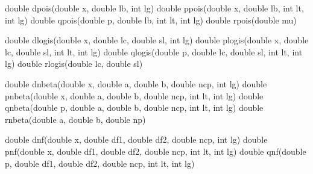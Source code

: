 \documentclass[]{book}
\newenvironment{Shaded}{\begin{snugshade}}{\end{snugshade}}
\newcommand{\DataTypeTok}[1]{\textcolor[rgb]{0.13,0.29,0.53}{#1}}
\newcommand{\NormalTok}[1]{#1}
\begin{document}
\begin{Shaded}
\begin{Highlighting}[]
\DataTypeTok{double}\NormalTok{ dpois(}\DataTypeTok{double}\NormalTok{ x, }\DataTypeTok{double}\NormalTok{ lb, }\DataTypeTok{int}\NormalTok{ lg)       }
\DataTypeTok{double}\NormalTok{ ppois(}\DataTypeTok{double}\NormalTok{ x, }\DataTypeTok{double}\NormalTok{ lb, }\DataTypeTok{int}\NormalTok{ lt, }\DataTypeTok{int}\NormalTok{ lg)   }
\DataTypeTok{double}\NormalTok{ qpois(}\DataTypeTok{double}\NormalTok{ p, }\DataTypeTok{double}\NormalTok{ lb, }\DataTypeTok{int}\NormalTok{ lt, }\DataTypeTok{int}\NormalTok{ lg)   }
\DataTypeTok{double}\NormalTok{ rpois(}\DataTypeTok{double}\NormalTok{ mu)             }

\DataTypeTok{double}\NormalTok{ dlogis(}\DataTypeTok{double}\NormalTok{ x, }\DataTypeTok{double}\NormalTok{ lc, }\DataTypeTok{double}\NormalTok{ sl, }\DataTypeTok{int}\NormalTok{ lg)       }
\DataTypeTok{double}\NormalTok{ plogis(}\DataTypeTok{double}\NormalTok{ x, }\DataTypeTok{double}\NormalTok{ lc, }\DataTypeTok{double}\NormalTok{ sl, }\DataTypeTok{int}\NormalTok{ lt, }\DataTypeTok{int}\NormalTok{ lg)   }
\DataTypeTok{double}\NormalTok{ qlogis(}\DataTypeTok{double}\NormalTok{ p, }\DataTypeTok{double}\NormalTok{ lc, }\DataTypeTok{double}\NormalTok{ sl, }\DataTypeTok{int}\NormalTok{ lt, }\DataTypeTok{int}\NormalTok{ lg)   }
\DataTypeTok{double}\NormalTok{ rlogis(}\DataTypeTok{double}\NormalTok{ lc, }\DataTypeTok{double}\NormalTok{ sl)                 }

\DataTypeTok{double}\NormalTok{ dnbeta(}\DataTypeTok{double}\NormalTok{ x, }\DataTypeTok{double}\NormalTok{ a, }\DataTypeTok{double}\NormalTok{ b, }\DataTypeTok{double}\NormalTok{ ncp, }\DataTypeTok{int}\NormalTok{ lg)     }
\DataTypeTok{double}\NormalTok{ pnbeta(}\DataTypeTok{double}\NormalTok{ x, }\DataTypeTok{double}\NormalTok{ a, }\DataTypeTok{double}\NormalTok{ b, }\DataTypeTok{double}\NormalTok{ ncp, }\DataTypeTok{int}\NormalTok{ lt, }\DataTypeTok{int}\NormalTok{ lg) }
\DataTypeTok{double}\NormalTok{ qnbeta(}\DataTypeTok{double}\NormalTok{ p, }\DataTypeTok{double}\NormalTok{ a, }\DataTypeTok{double}\NormalTok{ b, }\DataTypeTok{double}\NormalTok{ ncp, }\DataTypeTok{int}\NormalTok{ lt, }\DataTypeTok{int}\NormalTok{ lg) }
\DataTypeTok{double}\NormalTok{ rnbeta(}\DataTypeTok{double}\NormalTok{ a, }\DataTypeTok{double}\NormalTok{ b, }\DataTypeTok{double}\NormalTok{ np)                    }

\DataTypeTok{double}\NormalTok{ dnf(}\DataTypeTok{double}\NormalTok{ x, }\DataTypeTok{double}\NormalTok{ df1, }\DataTypeTok{double}\NormalTok{ df2, }\DataTypeTok{double}\NormalTok{ ncp, }\DataTypeTok{int}\NormalTok{ lg)        }
\DataTypeTok{double}\NormalTok{ pnf(}\DataTypeTok{double}\NormalTok{ x, }\DataTypeTok{double}\NormalTok{ df1, }\DataTypeTok{double}\NormalTok{ df2, }\DataTypeTok{double}\NormalTok{ ncp, }\DataTypeTok{int}\NormalTok{ lt, }\DataTypeTok{int}\NormalTok{ lg)    }
\DataTypeTok{double}\NormalTok{ qnf(}\DataTypeTok{double}\NormalTok{ p, }\DataTypeTok{double}\NormalTok{ df1, }\DataTypeTok{double}\NormalTok{ df2, }\DataTypeTok{double}\NormalTok{ ncp, }\DataTypeTok{int}\NormalTok{ lt, }\DataTypeTok{int}\NormalTok{ lg)    }


\end{Highlighting}
\end{Shaded}
\end{document}
